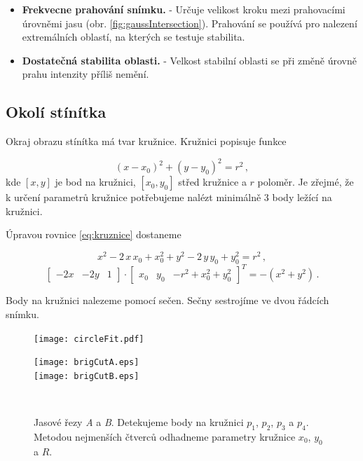    \begin{itemize}
   \item \textbf{Frekvecne prahování snímku.} - Určuje velikost kroku mezi prahovacími úrovněmi jasu (obr. \ref{fig:gaussIntersection}). Prahování se používá pro nalezení extremálních oblastí, na kterých se testuje stabilita.
   
   \item \textbf{Dostatečná stabilita oblasti.} - Velkost stabilní oblasti se při změně úrovně prahu intenzity příliš nemění. 
   \end{itemize}
   
\subsection{Okolí stínítka}
\label{sec:okoliStinitka}
	Okraj obrazu stínítka má tvar kružnice. Kružnici popisuje funkce
	
	\begin{equation}
	\left(x-x_0\right)^2 + \left(y-y_0\right)^2 = r^2\,,
	\label{eq:kruznice}
	\end{equation}
	kde $\left[x,y\right]$ je bod na kružnici, $\left[x_0,y_0\right]$ střed kružnice a $r$ poloměr. Je zřejmé, že k určení parametrů kružnice potřebujeme nalézt minimálně 3 body ležící na kružnici. 

	Úpravou rovnice \ref{eq:kruznice} dostaneme

	\begin{equation}
	x^2 -2\,x\,x_0 + x_0^2 + y^2 -2\,y\,y_0 + y_0^2 = r^2\,,
	\end{equation}
	\begin{equation}
	\begin{bmatrix}
    -2x &-2y &1 
	\end{bmatrix} \cdot 
	\begin{bmatrix}
    x_0 & y_0 & -r^2+x_0^2+y_0^2
	\end{bmatrix}^T = -\left(x^2+y^2\right)\,.
	\end{equation}


  
Body na kružnici nalezeme pomocí sečen. Sečny sestrojíme ve dvou řádcích snímku. %
\begin{figure}[htbp]
    \centering
    \begin{minipage}[c]{0.48\textwidth}
        \centering\texttt{[image: circleFit.pdf]}
    \end{minipage}
    \begin{minipage}[c]{0.48\textwidth}
        \centering\texttt{[image: brigCutA.eps]}\\
        
        \centering\texttt{[image: brigCutB.eps]}
    \end{minipage}
    \\
        \caption[Detekce okolí stínítka.]{Jasové řezy \textit{A} a \textit{B}. Detekujeme body na kružnici $p_1$, $p_2$, $p_3$ a $p_4$. Metodou nejmenších čtverců odhadneme parametry kružnice $x_0$, $y_0$ a $R$.}
        \label{fig:CircleFit}
\end{figure}

